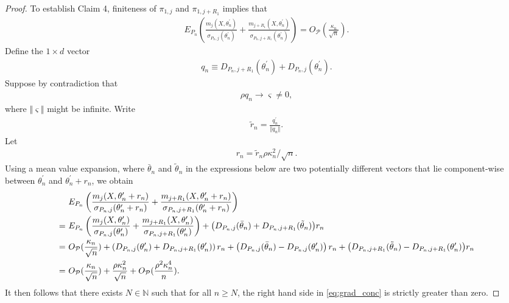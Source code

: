 \documentclass[letterpaper,11pt]{article}
\theoremstyle{myplain}
\theoremstyle{mydefinition}
\theoremstyle{myremark}
\newcommand{\N}{\mathbb{N}}
\newcommand{\cP}{\mathcal{P}}
\numberwithin{equation}{section}
\numberwithin{figure}{section}
\begin{document}
\begin{appendices}
\begin{proof}
To establish Claim 4, finiteness of $\pi_{1,j}$ and $\pi_{1,j+R_1}$ implies that 
\begin{align}
E_{P_n}\left( \frac{m_j(X,\theta^\prime_n)}{\sigma_{P_n,j}(\theta^\prime_n)} + \frac{m_{j+R_1}(X,\theta^\prime_n)}{\sigma_{P_n,j+R_1}(\theta^\prime_n)}\right) = O_\cP\left(\frac{\kappa_n}{\sqrt n}\right).
\end{align}
Define the $1 \times d$ vector
\begin{align}
q_n \equiv D_{P_n,j+R_1}(\theta^\prime_n)+D_{P_n,j}(\theta^\prime_n).
\end{align}
Suppose by contradiction that
\begin{align*}
\rho q_n \to \varsigma \neq 0,
\end{align*}
where $\Vert \varsigma \Vert$ might be infinite.
Write
\begin{align}
\tilde{r}_n = \frac{q_n^\prime}{\Vert q_n \Vert}.
\end{align}
Let
\begin{align}
r_n = \tilde{r}_n \rho  \kappa_n^2/\sqrt n.
\end{align}
Using a mean value expansion, where $\bar{\theta}_n$ and $\tilde{\theta}_n$ in the expressions below are two potentially different vectors that lie component-wise between $\theta^\prime_n$ and $\theta^\prime_n+r_n$, we obtain
\begin{align}
&~E_{P_n}\left( \frac{m_j(X,\theta^\prime_n+r_n)}{\sigma_{P_n,j}(\theta^\prime_n+r_n)} + \frac{m_{j+R_1}(X,\theta^\prime_n+r_n)}{\sigma_{P_n,j+R_1}(\theta^\prime_n+r_n)}\right) \notag \\
=&~E_{P_n}\left( \frac{m_j(X,\theta^\prime_n)}{\sigma_{P_n,j}(\theta^\prime_n)} + \frac{m_{j+R_1}(X,\theta^\prime_n)}{\sigma_{P_n,j+R_1}(\theta^\prime_n)}\right) +\bigl(D_{P_n,j}(\bar{\theta}_n)+D_{P_n,j+R_1}(\tilde{\theta}_n)\bigr)r_n \notag\\
 =&~ O_\cP(\frac{\kappa_n}{\sqrt n})+\left(D_{P_n,j}(\theta^\prime_n)+D_{P_n,j+R_1}(\theta^\prime_n)\right)r_n+\left(D_{P_n,j}(\bar{\theta}_n)-D_{P_n,j}(\theta^\prime_n)\right)r_n+\bigl(D_{P_n,j+R_1}(\tilde{\theta}_n)-D_{P_n,j+R_1}(\theta^\prime_n)\bigr)r_n \notag \\
 =&~O_\cP(\frac{\kappa_n}{\sqrt n})+ \frac{\rho \kappa_n^2}{\sqrt n} + O_\cP(\frac{\rho ^2\kappa_n^4}{n}).\label{eq:grad_conc}
\end{align}
It then follows that there exists $N \in \N$ such that for all $n \ge N$, the right hand side in \eqref{eq:grad_conc} is strictly greater than zero.


\end{proof}
\end{appendices}
\end{document}
